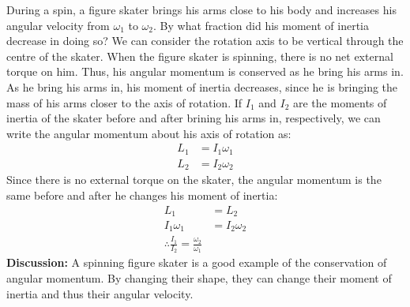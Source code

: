 \begin{example}{During a spin, a figure skater brings his arms close to his body and increases his angular velocity from $\omega_1$ to $\omega_2$. By what fraction did his moment of inertia decrease in doing so?}
We can consider the rotation axis to be vertical through the centre of the skater. When the figure skater is spinning, there is no net external torque on him. Thus, his angular momentum is conserved as he bring his arms in. As he bring his arms in, his moment of inertia decreases, since he is bringing the mass of his arms closer to the axis of rotation. If $I_1$ and $I_2$ are the moments of inertia of the skater before and after brining his arms in, respectively, we can write the angular momentum about his axis of rotation as:
\begin{align*}
L_1 &= I_1\omega_1\\
L_2 &= I_2\omega_2
\end{align*}
Since there is no external torque on the skater, the angular momentum is the same before and after he changes his moment of inertia:
\begin{align*}
L_1 &= L_2\\
I_1\omega_1 &= I_2\omega_2\\
\therefore \frac{I_1}{I_2} = \frac{\omega_2}{\omega_1}
\end{align*}
\textbf{Discussion:} A spinning figure skater is a good example of the conservation of angular momentum. By changing their shape, they can change their moment of inertia and thus their angular velocity. 
\end{example}

